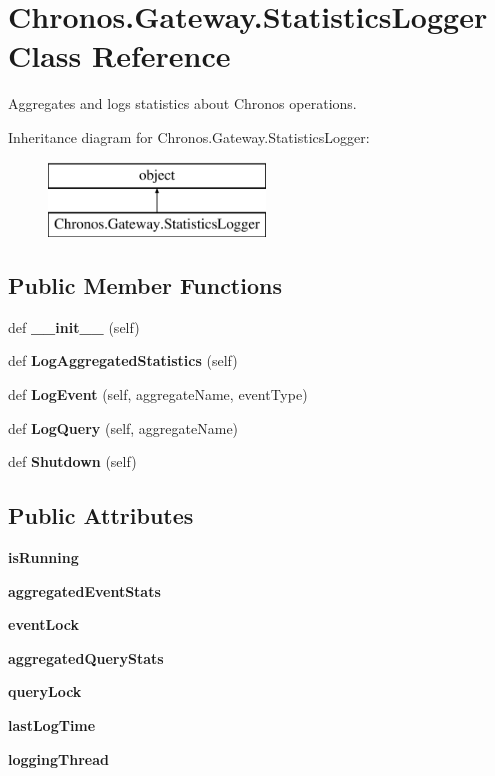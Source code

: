 \hypertarget{classChronos_1_1Gateway_1_1StatisticsLogger}{}\section{Chronos.\+Gateway.\+Statistics\+Logger Class Reference}
\label{classChronos_1_1Gateway_1_1StatisticsLogger}


Aggregates and logs statistics about Chronos operations.  


Inheritance diagram for Chronos.\+Gateway.\+Statistics\+Logger\+:\begin{figure}[H]
\begin{center}
\leavevmode
\includegraphics[height=2.000000cm]{classChronos_1_1Gateway_1_1StatisticsLogger}
\end{center}
\end{figure}
\subsection*{Public Member Functions}
\begin{DoxyCompactItemize}
\item 
def {\bfseries \+\_\+\+\_\+init\+\_\+\+\_\+} (self)
\item 
def {\bfseries Log\+Aggregated\+Statistics} (self)
\item 
def {\bfseries Log\+Event} (self, aggregate\+Name, event\+Type)
\item 
def {\bfseries Log\+Query} (self, aggregate\+Name)
\item 
def {\bfseries Shutdown} (self)
\end{DoxyCompactItemize}
\subsection*{Public Attributes}
\begin{DoxyCompactItemize}
\item 
{\bfseries is\+Running}
\item 
{\bfseries aggregated\+Event\+Stats}
\item 
{\bfseries event\+Lock}
\item 
{\bfseries aggregated\+Query\+Stats}
\item 
{\bfseries query\+Lock}
\item 
{\bfseries last\+Log\+Time}
\item 
{\bfseries logging\+Thread}
\end{DoxyCompactItemize}
